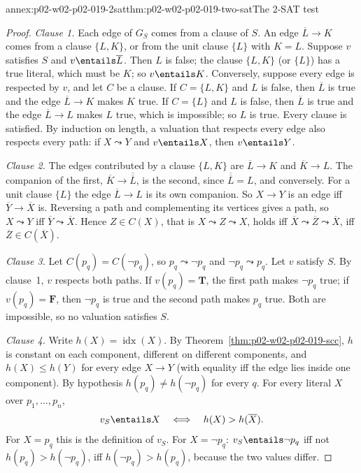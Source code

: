 \begin{annexitem}{annex:p02-w02-p02-019-2sat}{thm:p02-w02-p02-019-two-sat}{The 2-SAT test}
\begin{proof}
\emph{Clause 1.}  Each edge of \(G_S\) comes from a clause of \(S\).  An edge
\(\overline L\to K\) comes from a clause \(\{L,K\}\), or from the unit clause
\(\{L\}\) with \(K=L\).  Suppose \(v\) satisfies \(S\) and \(v\entails\overline L\).
Then \(L\) is false; the clause \(\{L,K\}\) (or \(\{L\}\)) has a true
literal, which must be \(K\); so \(v\entails K\).  Conversely, suppose every
edge is respected by \(v\), and let \(C\) be a clause.  If \(C=\{L,K\}\) and
\(L\) is false, then \(\overline L\) is true and the edge \(\overline L\to K\)
makes \(K\) true.  If \(C=\{L\}\) and \(L\) is false, then \(\overline L\) is
true and the edge \(\overline L\to L\) makes \(L\) true, which is impossible;
so \(L\) is true.  Every clause is satisfied.  By induction on length, a
valuation that respects every edge also respects every path: if
\(X\leadsto Y\) and \(v\entails X\), then \(v\entails Y\).

\emph{Clause 2.}  The edges contributed by a clause \(\{L,K\}\) are
\(\overline L\to K\) and \(\overline K\to L\).  The companion of the first,
\(\overline K\to\overline{\overline L}\), is the second, since
\(\overline{\overline L}=L\), and conversely.  For a unit clause \(\{L\}\)
the edge \(\overline L\to L\) is its own companion.  So \(X\to Y\) is an edge
iff \(\overline Y\to\overline X\) is.  Reversing a path and complementing its
vertices gives a path, so \(X\leadsto Y\) iff
\(\overline Y\leadsto\overline X\).  Hence \(Z\in C(X)\), that is
\(X\leadsto Z\leadsto X\), holds iff \(\overline X\leadsto\overline Z\leadsto
\overline X\), iff \(\overline Z\in C(\overline X)\).

\emph{Clause 3.}  Let \(C(p_q)=C(\neg p_q)\), so \(p_q\leadsto\neg p_q\) and
\(\neg p_q\leadsto p_q\).  Let \(v\) satisfy \(S\).  By clause~1, \(v\)
respects both paths.  If \(v(p_q)=\mathbf{T}\), the first path makes \(\neg p_q\)
true; if \(v(p_q)=\mathbf{F}\), then \(\neg p_q\) is true and the second path makes
\(p_q\) true.  Both are impossible, so no valuation satisfies \(S\).

\emph{Clause 4.}  Write \(h(X)=\operatorname{idx}(X)\).  By
Theorem~\ref{thm:p02-w02-p02-019-scc}, \(h\) is constant on each component,
different on different components, and \(h(X)\leq h(Y)\) for every edge
\(X\to Y\) (with equality iff the edge lies inside one component).  By
hypothesis \(h(p_q)\neq h(\neg p_q)\) for every \(q\).  For every literal
\(X\) over \(p_1,\ldots,p_n\),
\[
 v_S\entails X\quad\Longleftrightarrow\quad h(X)>h(\overline X).
\]
For \(X=p_q\) this is the definition of \(v_S\).  For \(X=\neg p_q\):
\(v_S\entails\neg p_q\) iff not \(h(p_q)>h(\neg p_q)\), iff
\(h(\neg p_q)>h(p_q)\), because the two values differ.


\end{proof}
\end{annexitem}
